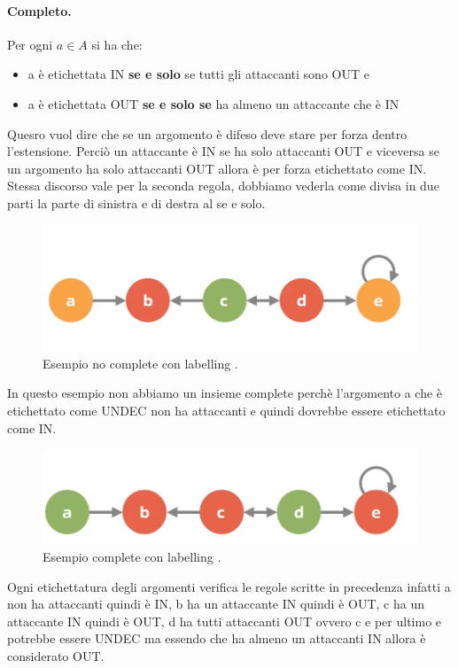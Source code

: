 \paragraph{Completo.}
Per ogni $a \in A$ si ha che:
\begin{itemize}
    \item a è etichettata IN \textbf{se e solo} se tutti gli attaccanti sono OUT e
    \item a è etichettata OUT\textbf{ se e solo se} ha almeno un attaccante che è IN
\end{itemize}
Quesro vuol dire che se un argomento è difeso deve stare per forza dentro l'estensione. Perciò un attaccante è IN se ha solo attaccanti OUT e viceversa se un argomento ha solo attaccanti OUT allora è per forza etichettato come IN. Stessa discorso vale per la seconda regola, dobbiamo vederla come divisa in due parti la parte di sinistra e di destra al se e solo. 

\begin{figure}[H]
    \centering
    \includegraphics[width=13cm, keepaspectratio]{img/es_no_complete_labelling.png}
    \caption{Esempio no complete con labelling .}\label{fig:es_no_complete_labelling}
\end{figure}
In questo esempio non abbiamo un insieme complete perchè l'argomento a che è etichettato come UNDEC non ha attaccanti e quindi dovrebbe essere etichettato come IN.

\begin{figure}[H]
    \centering
    \includegraphics[width=13cm, keepaspectratio]{img/es_complete_labelling.png}
    \caption{Esempio  complete con labelling .}\label{fig:es_no_complete_labelling}
\end{figure}
Ogni etichettatura degli argomenti verifica le regole scritte in precedenza infatti a non ha attaccanti quindi è IN, b ha un attaccante IN quindi è OUT, c ha un attaccante IN quindi è OUT, d ha tutti attaccanti OUT ovvero c e per ultimo e potrebbe essere UNDEC ma essendo che ha almeno un attaccanti IN allora è considerato OUT.

